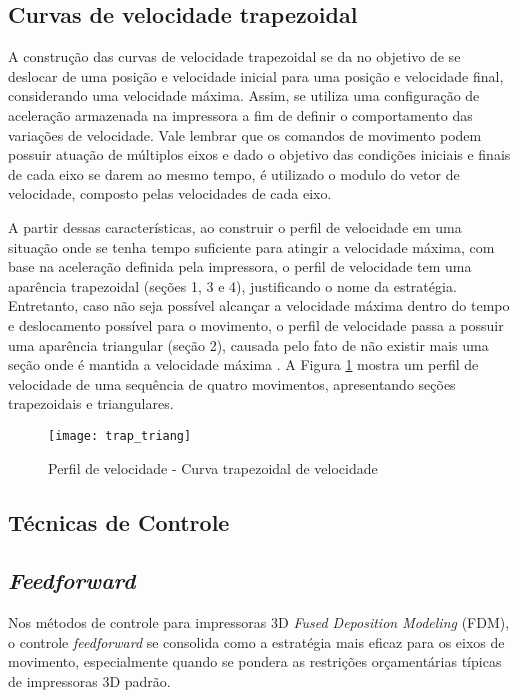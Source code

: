 \subsection{Curvas de velocidade trapezoidal}
A construção das curvas de velocidade trapezoidal se da no objetivo de se deslocar de uma posição e velocidade inicial para uma posição e velocidade final, considerando uma velocidade máxima. Assim, se utiliza uma configuração de aceleração armazenada na impressora a fim de definir o comportamento das variações de velocidade. Vale lembrar que os comandos de movimento podem possuir atuação de múltiplos eixos e dado o objetivo das condições iniciais e finais de cada eixo se darem ao mesmo tempo, é utilizado o modulo do vetor de velocidade, composto pelas velocidades de cada eixo.

A partir dessas características, ao construir o perfil de velocidade em uma situação onde se tenha tempo suficiente para atingir a velocidade máxima, com base na aceleração definida pela impressora, o perfil de velocidade tem uma aparência trapezoidal (seções 1, 3 e 4), justificando o nome da estratégia. Entretanto, caso não seja possível alcançar a velocidade máxima dentro do tempo e deslocamento possível para o movimento, o perfil de velocidade passa a possuir uma aparência triangular (seção 2), causada pelo fato de não existir mais uma seção onde é mantida a velocidade máxima \cite{yu20,klipperkinematic}. A Figura \ref{fig:trap_triang} mostra um perfil de velocidade de uma sequência de quatro movimentos, apresentando seções trapezoidais e triangulares.

\begin{figure}[H]
    \centering
    \caption{Perfil de velocidade - Curva trapezoidal de velocidade}
    \texttt{[image: trap\_triang]}
    \label{fig:trap_triang}
\end{figure}


\subsection{Técnicas de Controle}

\subsection{\textit{Feedforward}}
Nos métodos de controle para impressoras 3D \textit{Fused Deposition Modeling} (FDM), o controle \textit{feedforward} se consolida como a estratégia mais eficaz para os eixos de movimento, especialmente quando se pondera as restrições orçamentárias típicas de impressoras 3D padrão.

